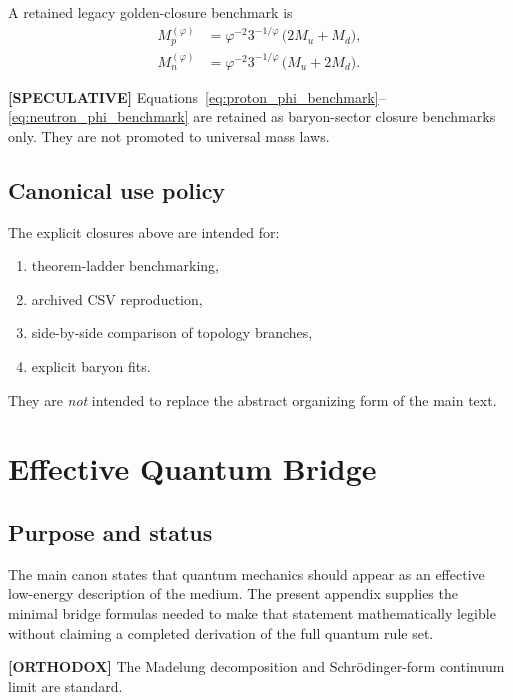 \documentclass[11pt]{article}
\theoremstyle{definition}
\theoremstyle{plain}
\theoremstyle{remark}
\begin{document}
        A retained legacy golden-closure benchmark is
        \begin{align}
            M_p^{(\varphi)}
            &=
            \varphi^{-2} 3^{-1/\varphi}\,\bigl(2M_u + M_d\bigr),
            \label{eq:proton_phi_benchmark}\\
            M_n^{(\varphi)}
            &=
            \varphi^{-2} 3^{-1/\varphi}\,\bigl(M_u + 2M_d\bigr).
            \label{eq:neutron_phi_benchmark}
        \end{align}
        
        \textbf{[SPECULATIVE]} Equations~\eqref{eq:proton_phi_benchmark}--\eqref{eq:neutron_phi_benchmark} are retained as baryon-sector closure benchmarks only. They are not promoted to universal mass laws.
    
    \subsection{Canonical use policy}
        The explicit closures above are intended for:
        \begin{enumerate}
            \item theorem-ladder benchmarking,
            \item archived CSV reproduction,
            \item side-by-side comparison of topology branches,
            \item explicit baryon fits.
        \end{enumerate}
        They are \emph{not} intended to replace the abstract organizing form of the main text.
    
    \section{Effective Quantum Bridge}
    \label{sec:appendix_quantum_bridge}
    
    \subsection{Purpose and status}
        The main canon states that quantum mechanics should appear as an effective low-energy description of the medium. The present appendix supplies the minimal bridge formulas needed to make that statement mathematically legible without claiming a completed derivation of the full quantum rule set.
        
        \textbf{[ORTHODOX]} The Madelung decomposition and Schr\"odinger-form continuum limit are standard.
        
\end{document}

